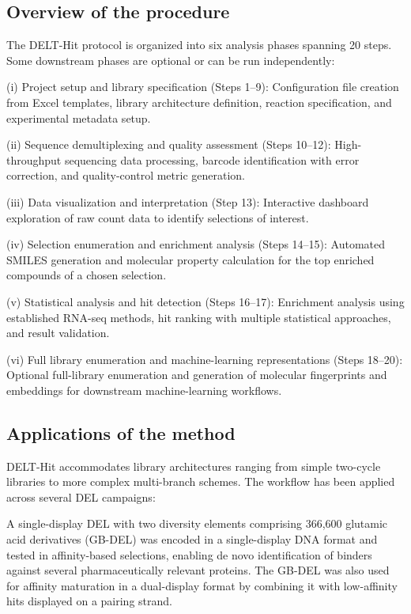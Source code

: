 \documentclass[pdflatex,sn-nature]{sn-jnl}
\begin{document}
\subsection{Overview of the procedure}
The DELT-Hit protocol is organized into six analysis phases spanning 20 steps. Some downstream phases are optional or can be run independently:

(i) Project setup and library specification (Steps 1--9): Configuration file creation from Excel templates, library architecture definition, reaction specification, and experimental metadata setup.

(ii) Sequence demultiplexing and quality assessment (Steps 10--12): High-throughput sequencing data processing, barcode identification with error correction, and quality-control metric generation.

(iii) Data visualization and interpretation (Step 13): Interactive dashboard exploration of raw count data to identify selections of interest.

(iv) Selection enumeration and enrichment analysis (Steps 14--15): Automated SMILES generation and molecular property calculation for the top enriched compounds of a chosen selection.

(v) Statistical analysis and hit detection (Steps 16--17): Enrichment analysis using established RNA-seq methods, hit ranking with multiple statistical approaches, and result validation.

(vi) Full library enumeration and machine-learning representations (Steps 18--20): Optional full-library enumeration and generation of molecular fingerprints and embeddings for downstream machine-learning workflows.


\subsection{Applications of the method}
DELT-Hit accommodates library architectures ranging from simple two-cycle libraries to more complex multi-branch schemes. The workflow has been applied across several DEL campaigns:

A single-display DEL with two diversity elements comprising 366,600 glutamic acid derivatives (GB-DEL) was encoded in a single-display DNA format and tested in affinity-based selections, enabling de novo identification of binders against several pharmaceutically relevant proteins. The GB-DEL was also used for affinity maturation in a dual-display format by combining it with low-affinity hits displayed on a pairing strand\cite{bassi_singlestrandeddnaencodedchemical_2020}.
\end{document}
